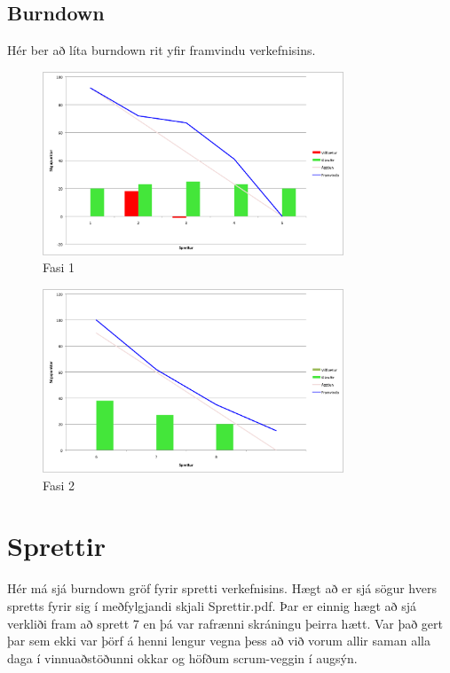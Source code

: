 \documentclass{article}
\begin{document}
\newpage

\subsection{Burndown}
Hér ber að líta burndown rit yfir framvindu verkefnisins.

\begin{figure}[H]
  \centering
  \includegraphics[width=0.8\textwidth]{Fasi1_burndown.png} 
  \caption{Fasi 1} 
\end{figure}

\begin{figure}[H]
  \centering
  \includegraphics[width=0.8\textwidth]{Fasi2_burndown.png} 
  \caption{Fasi 2} 
\end{figure}

\newpage
\section{Sprettir}
Hér má sjá burndown gröf fyrir spretti verkefnisins. Hægt að er sjá sögur 
hvers spretts fyrir sig í meðfylgjandi skjali Sprettir.pdf. Þar er einnig 
hægt að sjá verkliði fram að sprett 7 en þá var rafrænni skráningu þeirra 
hætt. Var það gert þar sem ekki var þörf á henni lengur vegna þess að við vorum allir saman 
alla daga í vinnuaðstöðunni okkar og höfðum scrum-veggin í augsýn.
\end{document}

